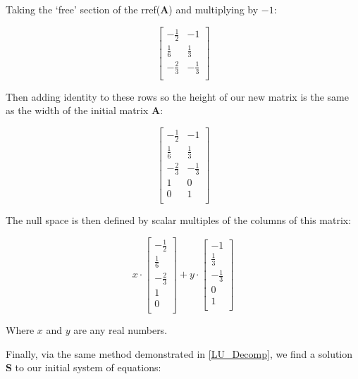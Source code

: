 Taking the `free' section of the rref($\mathbf{A}$) and multiplying by $-1$:

\begin{equation*}
	\begin{bmatrix}
	-\frac{1}{2} & -1 \\
	\frac{1}{6} & \frac{1}{3} \\
	-\frac{2}{3} & -\frac{1}{3} \\
	\end{bmatrix}
\end{equation*}

Then adding identity to these rows so the height of our new matrix is the same as the width of the initial matrix $\mathbf{A}$:

\begin{equation*}
	\begin{bmatrix}
	-\frac{1}{2} & -1 \\
	\frac{1}{6} & \frac{1}{3} \\
	-\frac{2}{3} & -\frac{1}{3} \\
	1 & 0 \\
	0 & 1 \\
	\end{bmatrix}
\end{equation*}

The null space is then defined by scalar multiples of the columns of this matrix:

\begin{equation*}
	x \cdot
	\begin{bmatrix}
		-\frac{1}{2} \\
		\frac{1}{6} \\
		-\frac{2}{3} \\
		1 \\
		0 \\
	\end{bmatrix}
	+ y \cdot
	\begin{bmatrix}
		-1 \\
		\frac{1}{3} \\
		-\frac{1}{3} \\
		0 \\
		1 \\
	\end{bmatrix}
\end{equation*}

\begin{center}
	Where $x$ and $y$ are any real numbers.
\end{center}

Finally, via the same method demonstrated in \ref{LU_Decomp}, we find a solution $\mathbf{S}$ to our initial system of equations:

